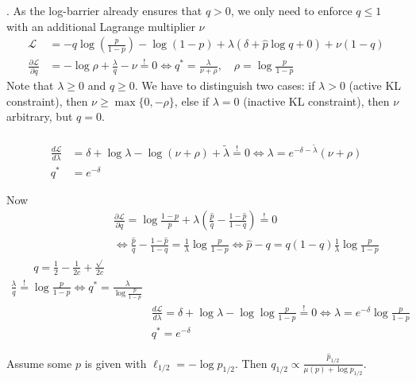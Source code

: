 \documentclass{article}
\begin{document}
\newpage

. As the log-barrier already ensures that $q>0$, we only need to enforce $q\le 1$ with an additional Lagrange multiplier $\nu$
\begin{align}
\mathcal L & = -q \log \left( \frac{p}{1-p} \right) - \log (1-p) + \lambda ( \delta +\hat p \log q + 0) + \nu (1-q)\\
%
\frac{\partial \mathcal L}{\partial q} &= - \log \rho +  \frac{\lambda }{q} - \nu \stackrel != 0 
\iff
q^* = \frac{\lambda}{\nu + \rho }, \quad \rho = \log \frac{p}{1-p}
\end{align}
Note that $\lambda \ge 0$ and $q \ge 0$. We have to distinguish two cases: if $\lambda>0$ (active KL constraint), then  $\nu \ge \max\{0,-\rho\}$, else if $\lambda = 0$ (inactive KL constraint), then $\nu$ arbitrary, but $q=0$.  
 

\begin{align}
% 
\\
 \frac{d \mathcal L}{d \lambda} &=  \delta +  \log \lambda - \log(\nu + \rho)  + \tilde \lambda \stackrel !=0 
\iff \lambda = e^{-\delta- \tilde \lambda} (\nu + \rho)   \\
q^* & = e^{-\delta}
\end{align}

\newpage

Now 
\begin{align}
& \frac{\partial \mathcal L}{\partial q} = \log \frac{1-p}{p} + \lambda\left( \frac{\hat p}{q} - \frac{1-\hat p}{1-q}\right) \stackrel != 0 \\
& \iff \frac{\hat p}{q} - \frac{1-\hat p}{1-q} = \frac 1 \lambda \log \frac{p}{1-p} 
 \iff \hat p-q  = q(1-q) \frac 1 \lambda \log \frac{p}{1-p} \\
 q = \frac 12 -\frac 1{2c} + \frac{\sqrt{}}{2c}
\end{align}
\begin{align}
\frac{\lambda}{q} \stackrel != \log \frac{p}{1-p}   \iff q^* = \frac{\lambda}{\log \frac{p}{1-p}} \\
& \frac{d \mathcal L}{d \lambda} = \delta +  \log \lambda - \log \log \frac{p}{1-p} \stackrel !=0 
\iff \lambda = e^{-\delta} \log \frac{p}{1-p}   \\
& q^* = e^{-\delta}
\end{align}

\newpage


Assume some $p$ is given with $\ell_{1/2} = - \log p_{1/2}$. Then $q_{1/2} \propto \frac{\hat  p_{1/2}}{\mu(p) + \log p_{1/2}}$. 
\end{document}
